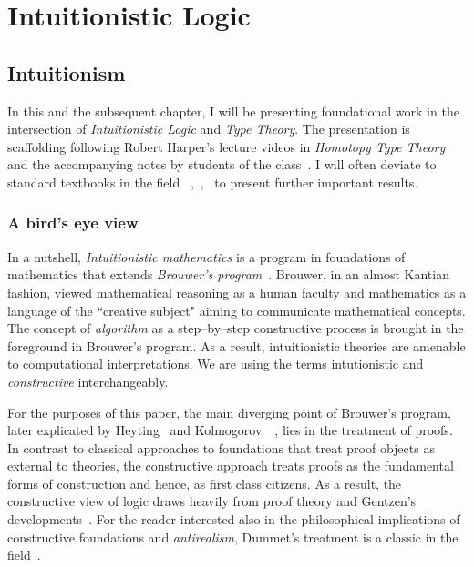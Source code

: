 \chapter{Intuitionistic Logic}\label{intui}
\section{Intuitionism}\label{sec:intrui}
In this and the subsequent chapter, I will be presenting foundational work in the intersection of \emph{Intuitionistic Logic} and \emph{Type Theory}. 
The presentation is scaffolding following Robert Harper's lecture videos in \emph{Homotopy Type Theory}~\cite{HarperHOTT} and the accompanying notes by students of the class~\cite{HOTTNotes1}. I will often deviate to standard textbooks in the field ~\cite{Barendregt1984-BARTLC},~\cite{citeulike:993095},~\cite{Pierce:2002:TPL:509043} to present further important results. 
\subsection{A bird's eye view}  
In a nutshell, \emph{Intuitionistic mathematics}  is a program in foundations 
of mathematics  that extends \emph{Brouwer's program}~\cite{brouwer1975collected}.
Brouwer, in an almost Kantian fashion, viewed mathematical reasoning as a human faculty 
and mathematics as a language of the ``creative subject"
aiming to communicate mathematical concepts. 
The concept of \emph{algorithm} as a step--by--step constructive process is brought in the 
foreground in Brouwer's program. 
As a result, intuitionistic theories are amenable to 
computational interpretations. We are  using the terms intutionistic 
and \emph{constructive} interchangeably.  

For the purposes of this paper, the main diverging point of
 Brouwer's program, 
later explicated by Heyting~\cite{heyting1966intuitionism} 
and Kolmogorov~\cite{kolmogorov1925principe}~\cite{artemov2004kolmogorov}, lies in the treatment of proofs. In contrast to classical approaches to foundations 
that treat proof objects as external to theories, 
the constructive approach treats proofs 
as the fundamental forms of construction and hence, 
as first class citizens. 
As a result, the constructive view of logic draws heavily 
from proof theory
and Gentzen's developments~\cite{gentzen1970collected}. 
For the reader interested also in the philosophical implications  
of constructive foundations and \emph{antirealism}, 
Dummet's treatment is a classic in the field~\cite{dummett2000elements}.    
 


